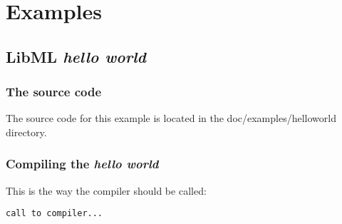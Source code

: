 \part{Examples}
\chapter{LibML \textit{hello world}}

\section{The source code}

The source code for this example is located in the doc/examples/helloworld
directory.

\section{Compiling the \textit{hello world}}
This is the way the compiler should be called:

\begin{verbatim}
call to compiler...
\end{verbatim}
